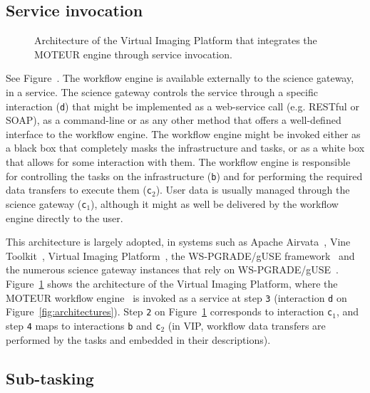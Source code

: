 \documentclass[preprint,3p,twocolumn]{elsarticle}
\begin{document}
\subsection{Service invocation}

\begin{figure}
\centering
\def\svgwidth{1.5\columnwidth}

\caption{Architecture of the Virtual Imaging Platform that integrates
  the MOTEUR engine through service invocation.}
\label{fig:vip-architecture}
\end{figure}

See Figure~. The workflow engine is available
externally to the science gateway, in a service. The science gateway
controls the service through a specific interaction (\texttt{d}) that
might be implemented as a web-service call (e.g. RESTful or SOAP), as
a command-line or as any other method that offers a well-defined
interface to the workflow engine. The workflow engine might be invoked
either as a black box that completely masks the infrastructure and
tasks, or as a white box that allows for some interaction with
them. The workflow engine is responsible for controlling the tasks on
the infrastructure (\texttt{b}) and for performing the required data
transfers to execute them (\texttt{c$_2$}). User data is usually
managed through the science gateway (\texttt{c$_1$}), although it
might as well be delivered by the workflow engine directly to the
user.

This architecture is largely adopted, in systems such as Apache
Airvata~\cite{marru2011apache}, Vine
Toolkit~\cite{DBLP:journals/scpe/SzejnfeldDKKKKLPTWDNW10}, Virtual
Imaging Platform~\cite{GLAT-13}, the WS-PGRADE/gUSE
framework~\cite{Kacsuk2012} and the numerous science gateway instances
that rely on
WS-PGRADE/gUSE~\cite{kacsuk2014science}. Figure~\ref{fig:vip-architecture}
shows the architecture of the Virtual Imaging Platform, where the
MOTEUR workflow engine~\cite{GLAT-08i} is invoked as a service at step
\texttt{3} (interaction \texttt{d} on
Figure~\ref{fig:architectures}). Step \texttt{2} on
Figure~\ref{fig:vip-architecture} corresponds to interaction
\texttt{c$_1$}, and step \texttt{4} maps to interactions \texttt{b}
and \texttt{c$_2$} (in VIP, workflow data transfers are performed by
the tasks and embedded in their descriptions).

\subsection{Sub-tasking}
\end{document}
